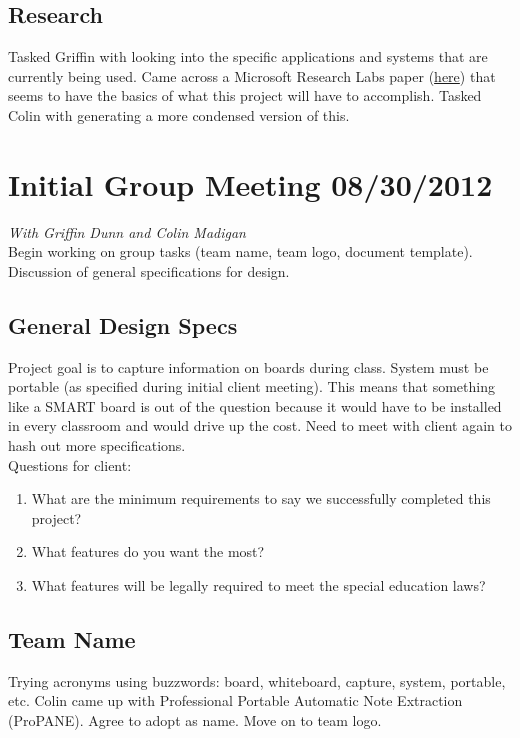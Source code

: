 \documentclass[]{article}
\begin{document}
		\subsection{Research}
			Tasked Griffin with looking into the specific applications and systems that are currently being used. Came across a Microsoft Research Labs paper (\href{http://research.microsoft.com/en-us/um/people/zhang/papers/tr-02-89.pdf}{here}) that seems to have the basics of what this project will have to accomplish. Tasked Colin with generating a more condensed version of this.	 
			
			
	
	\section{Initial Group Meeting 08/30/2012}
		\emph{With Griffin Dunn and Colin Madigan}\\
		Begin working on group tasks (team name, team logo, document template). Discussion of general specifications for design. 
		
		\subsection{General Design Specs}
			Project goal is to capture information on boards during class. System must be portable (as specified during initial client meeting). This means that something like a SMART board is out of the question because it would have to be installed in every classroom and would drive up the cost. Need to meet with client again to hash out more specifications. \\
			Questions for client:
			\begin{enumerate}
				\item What are the minimum requirements to say we successfully completed this project?
				\item What features do you want the most?
				\item What features will be legally required to meet the special education laws?
			\end{enumerate}
		
		\subsection{Team Name}
			Trying acronyms using buzzwords: board, whiteboard, capture, system, portable, etc. Colin came up with Professional Portable Automatic Note Extraction (ProPANE). Agree to adopt as name. Move on to team logo.
			
\end{document}
